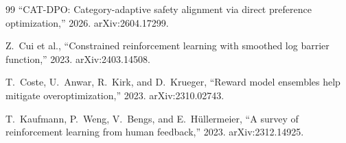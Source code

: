 \documentclass[12pt,a4paper,UTF8]{ctexart}
\begin{document}
\begin{thebibliography}{99}
``CAT-DPO: Category-adaptive safety alignment via direct preference optimization,''
2026. arXiv:2604.17299.

Z.~Cui et al.,
``Constrained reinforcement learning with smoothed log barrier function,''
2023. arXiv:2403.14508.

T.~Coste, U.~Anwar, R.~Kirk, and D.~Krueger,
``Reward model ensembles help mitigate overoptimization,''
2023. arXiv:2310.02743.

T.~Kaufmann, P.~Weng, V.~Bengs, and E.~H\"{u}llermeier,
``A survey of reinforcement learning from human feedback,''
2023. arXiv:2312.14925.

\end{thebibliography}

\end{document}
